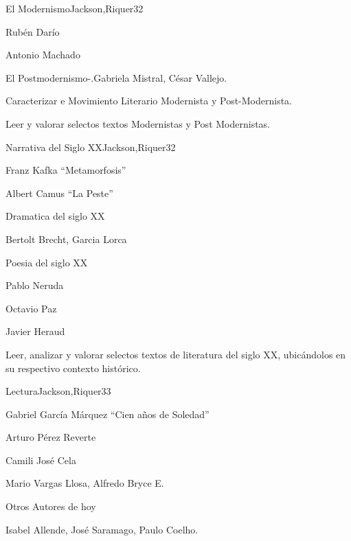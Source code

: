 \begin{syllabus}
\begin{unit}{El Modernismo}{Jackson,Riquer}{3}{2}
\begin{topics}
	\item Rubén Darío
	\item Antonio Machado
	\item El Postmodernismo-.Gabriela Mistral, César Vallejo.
\end{topics}
\begin{learningoutcomes}
	\item Caracterizar e Movimiento Literario Modernista y Post-Modernista.
	\item Leer y valorar selectos textos Modernistas y Post Modernistas.
\end{learningoutcomes}
\end{unit}

\begin{unit}{Narrativa del Siglo XX}{Jackson,Riquer}{3}{2}
\begin{topics}
	\item Franz Kafka ``Metamorfosis''
	\item Albert Camus ``La Peste''
	\item Dramatica del siglo XX
	\item Bertolt Brecht, Garcia Lorca
	\item Poesia del siglo XX
	\item Pablo Neruda
	\item Octavio Paz
	\item Javier Heraud
\end{topics}
\begin{learningoutcomes}
	\item Leer, analizar y valorar selectos textos de literatura del siglo XX, ubicándolos en su respectivo contexto histórico.
\end{learningoutcomes}
\end{unit}

\begin{unit}{Lectura}{Jackson,Riquer}{3}{3}
\begin{topics}
	\item Gabriel García Márquez ``Cien años de Soledad''
	\item Arturo Pérez Reverte
	\item Camili José Cela
	\item Mario Vargas Llosa, Alfredo Bryce E.
	\item Otros Autores de hoy
	\item Isabel Allende, José Saramago, Paulo Coelho.
\end{topics}
\end{unit}



\begin{coursebibliography}
\end{coursebibliography}
\end{syllabus}
